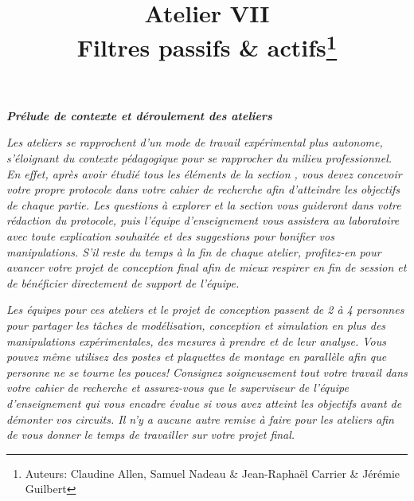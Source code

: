 \documentclass[canadien,12pt,oneside,letterpaper]{article}
\title{\textbf{Atelier VII}\\Filtres passifs \& actifs\thanks{Auteurs: Claudine Allen, Samuel Nadeau \& Jean-Raphaël Carrier \& Jérémie Guilbert}}
\date{}
\begin{document}
\maketitle \vspace{-2cm}

\noindent\textit{\textbf{Prélude de contexte et déroulement des ateliers}}

\textit{Les ateliers se rapprochent d'un mode de travail expérimental plus autonome, s'éloignant du contexte pédagogique pour se rapprocher du milieu professionnel. En effet, après avoir étudié tous les éléments de la section , vous devez concevoir votre propre protocole dans votre cahier de recherche afin d'atteindre les objectifs de chaque partie. Les questions à explorer et la section  vous guideront dans votre rédaction du protocole, puis l'équipe d'enseignement vous assistera au laboratoire avec toute explication souhaitée et des suggestions pour bonifier vos manipulations. S'il reste du temps à la fin de chaque atelier, profitez-en pour avancer votre projet de conception final afin de mieux respirer en fin de session et de bénéficier directement de support de l'équipe.}

\textit{Les équipes pour ces ateliers et le projet de conception passent de 2 à 4 personnes pour partager les tâches de modélisation, conception et simulation en plus des manipulations expérimentales, des mesures à prendre et de leur analyse. Vous pouvez même utilisez des postes et plaquettes de montage en parallèle afin que personne ne se tourne les pouces! Consignez soigneusement tout votre travail dans votre cahier de recherche et assurez-vous que le superviseur de l'équipe d'enseignement qui vous encadre évalue si vous avez atteint les objectifs avant de démonter vos circuits. Il n'y a aucune autre remise à faire pour les ateliers afin de vous donner le temps de travailler sur votre projet final.}


\vspace{-2.5ex}
\end{document}
